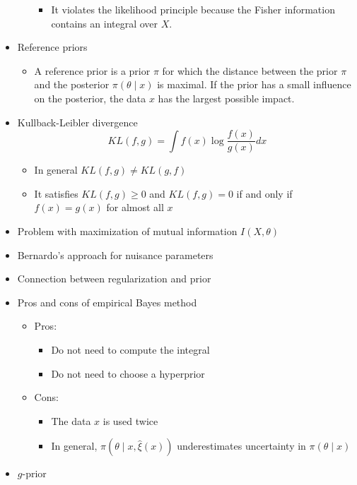 \documentclass[a4paper]{article}
\begin{document}
\begin{itemize}
\begin{itemize}
\begin{itemize}
            \item It violates the likelihood principle because the Fisher information contains an integral over $X$.
        \end{itemize}
    \end{itemize}
    \item Reference priors
    \begin{itemize}
        \item A reference prior is a prior $\pi$ for which the distance between the prior $\pi$ and the posterior $\pi(\theta\mid x)$ is maximal. If the prior has a small influence on the posterior, the data $x$ has the largest possible impact.
    \end{itemize}
    \item Kullback-Leibler divergence
    \[KL(f,g)=\int f(x)\log\frac{f(x)}{g(x)}dx \]
    \begin{itemize}
        \item In general $KL(f,g)\neq KL(g,f)$
        \item It satisfies $KL(f,g)\geq 0$ and $KL(f,g)=0$ if and only if $f(x)=g(x)$ for almost all $x$
    \end{itemize}
    \item Problem with maximization of mutual information $I(X,\theta)$
    \item Bernardo's approach for nuisance parameters
    \item Connection between regularization and prior
    \item Pros and cons of empirical Bayes method
    \begin{itemize}
        \item Pros:
        \begin{itemize}
            \item Do not need to compute the integral
            \item Do not need to choose a hyperprior
        \end{itemize}
        \item Cons:
        \begin{itemize}
            \item The data $x$ is used twice
            \item In general, $\pi(\theta\mid x,\widehat{\xi}(x))$ underestimates uncertainty in $\pi(\theta\mid x)$
        \end{itemize}
    \end{itemize}
    \item $g$-prior
    \begin{itemize}

\end{itemize}
\end{itemize}
\end{document}
